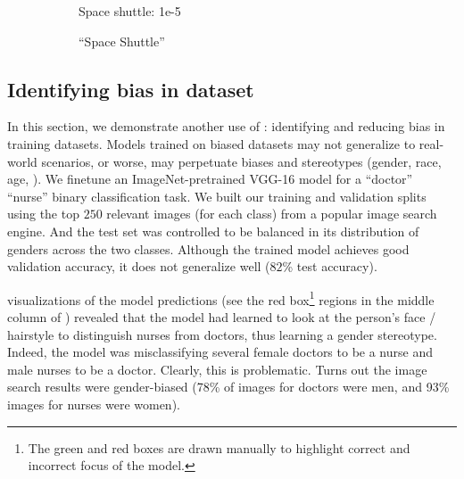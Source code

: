 \begin{figure}[ht!]
\begin{center}
\begin{subfigure}[b]{0.33\linewidth}
        \tiny{Space shuttle: 1e-5\\}
		\caption{\tiny{\gcam{} ``Space Shuttle''}}
        \label{fig:gcam_spaceshuttle_airliner}
	\end{subfigure}
	\vspace{14pt}
	\caption{
    }
    \label{fig:adversarial_main}
    \end{center}
\end{figure}

\vspace{-20pt}
\subsection{Identifying bias in dataset}\label{sec:bias}
In this section, we demonstrate another use of \gcam{}: identifying and
reducing bias in training datasets. Models trained on biased datasets may not
generalize to real-world scenarios, or worse, may perpetuate biases and stereotypes
(\wrt gender, race, age, \etc). %
We finetune an ImageNet-pretrained VGG-16 model for a ``doctor'' \vs ``nurse''
binary classification task. We built our training and validation splits using
the top $250$ relevant images (for each class) from a popular image search engine.
And the test set was controlled to be balanced in its distribution
of genders across the two classes. Although the trained model achieves good validation
accuracy, it does not generalize well ($82$\% test accuracy).


\gcam{} visualizations of the model predictions (see the red box\footnote{The green and red boxes are drawn manually to highlight correct and incorrect focus of the model.} regions in the middle column of )
revealed that the model had learned to look at the person's face / hairstyle to distinguish nurses from doctors, thus learning a gender stereotype.
Indeed, the model was misclassifying several female doctors to be a nurse and male nurses to be a doctor. Clearly, this is problematic. Turns out the image search results were gender-biased (78\% of images for doctors were men, and 93\% images for nurses were women).

